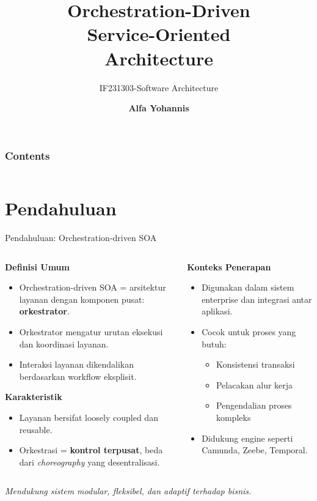 \documentclass[aspectratio=169, table]{beamer}
\title{\LARGE Orchestration-Driven\\Service-Oriented\\Architecture\\}
\subtitle{IF231303-Software Architecture}
\author{\textbf{Alfa Yohannis}}
\begin{document}
	
	\frame{\titlepage}
	
	
	\begin{frame}[fragile]
		\frametitle{Contents}
		\vspace{20pt}
		\begin{columns}[t]
			\tableofcontents[sections={1-5}]
			
			\tableofcontents[sections={6-10}]
		\end{columns}
	\end{frame}
	
\section{Pendahuluan}

\begin{frame}[fragile]{Pendahuluan: Orchestration-driven SOA}
	\vspace{10pt}
	\begin{columns}[T]
		\begin{column}{0.6\textwidth}
			\textbf{Definisi Umum}
			\begin{itemize}
				\item Orchestration-driven SOA = arsitektur layanan dengan komponen pusat: \textbf{orkestrator}.
				\item Orkestrator mengatur urutan eksekusi dan koordinasi layanan.
				\item Interaksi layanan dikendalikan berdasarkan workflow eksplisit.
			\end{itemize}
			
			\textbf{Karakteristik}
			\begin{itemize}
				\item Layanan bersifat loosely coupled dan reusable.
				\item Orkestrasi = \textbf{kontrol terpusat}, beda dari \textit{choreography} yang desentralisasi.
			\end{itemize}
		\end{column}
		
		\begin{column}{0.4\textwidth}
			\textbf{Konteks Penerapan}
			\begin{itemize}
				\item Digunakan dalam sistem enterprise dan integrasi antar aplikasi.
				\item Cocok untuk proses yang butuh:
				\begin{itemize}
					\item Konsistensi transaksi
					\item Pelacakan alur kerja
					\item Pengendalian proses kompleks
				\end{itemize}
				\item Didukung engine seperti Camunda, Zeebe, Temporal.
			\end{itemize}
		\end{column}
	\end{columns}
	\vspace{10pt}
\textit{Mendukung sistem modular, fleksibel, dan adaptif terhadap bisnis.}
\end{frame}
\end{document}
